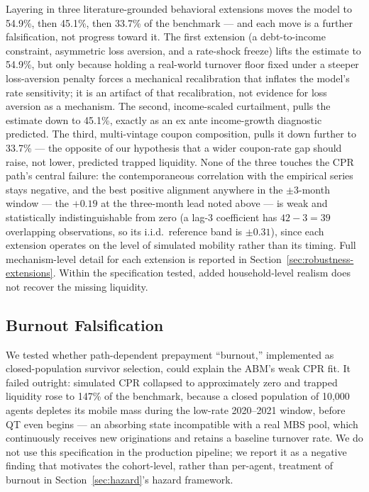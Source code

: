 \documentclass[12pt]{article}
\begin{document}
Layering in three literature-grounded behavioral extensions moves the model to 54.9\%, then 45.1\%, then 33.7\% of the benchmark --- and each move is a further falsification, not progress toward it. The first extension (a debt-to-income constraint, asymmetric loss aversion, and a rate-shock freeze) lifts the estimate to 54.9\%, but only because holding a real-world turnover floor fixed under a steeper loss-aversion penalty forces a mechanical recalibration that inflates the model's rate sensitivity; it is an artifact of that recalibration, not evidence for loss aversion as a mechanism. The second, income-scaled curtailment, pulls the estimate down to 45.1\%, exactly as an ex ante income-growth diagnostic predicted. The third, multi-vintage coupon composition, pulls it down further to 33.7\% --- the opposite of our hypothesis that a wider coupon-rate gap should raise, not lower, predicted trapped liquidity. None of the three touches the CPR path's central failure: the contemporaneous correlation with the empirical series stays negative, and the best positive alignment anywhere in the $\pm$3-month window --- the $+0.19$ at the three-month lead noted above --- is weak and statistically indistinguishable from zero (a lag-3 coefficient has $42 - 3 = 39$ overlapping observations, so its i.i.d.\ reference band is $\pm 0.31$), since each extension operates on the level of simulated mobility rather than its timing. Full mechanism-level detail for each extension is reported in Section~\ref{sec:robustness-extensions}. Within the specification tested, added household-level realism does not recover the missing liquidity.

\subsection{Burnout Falsification}\label{sec:abm-burnout}

We tested whether path-dependent prepayment ``burnout,'' implemented as closed-population survivor selection, could explain the ABM's weak CPR fit. It failed outright: simulated CPR collapsed to approximately zero and trapped liquidity rose to 147\% of the benchmark, because a closed population of 10,000 agents depletes its mobile mass during the low-rate 2020--2021 window, before QT even begins --- an absorbing state incompatible with a real MBS pool, which continuously receives new originations and retains a baseline turnover rate. We do not use this specification in the production pipeline; we report it as a negative finding that motivates the cohort-level, rather than per-agent, treatment of burnout in Section~\ref{sec:hazard}'s hazard framework.
\end{document}
